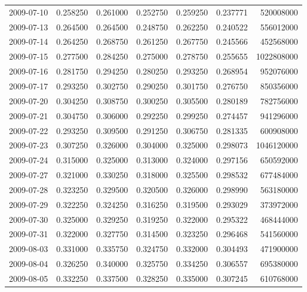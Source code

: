 \begin{tabular}{lrrrrrr}
2009-07-10 &    0.258250 &    0.261000 &    0.252750 &    0.259250 &    0.237771 &   520008000 \\
2009-07-13 &    0.264500 &    0.264500 &    0.248750 &    0.262250 &    0.240522 &   556012000 \\
2009-07-14 &    0.264250 &    0.268750 &    0.261250 &    0.267750 &    0.245566 &   452568000 \\
2009-07-15 &    0.277500 &    0.284250 &    0.275000 &    0.278750 &    0.255655 &  1022808000 \\
2009-07-16 &    0.281750 &    0.294250 &    0.280250 &    0.293250 &    0.268954 &   952076000 \\
2009-07-17 &    0.293250 &    0.302750 &    0.290250 &    0.301750 &    0.276750 &   850356000 \\
2009-07-20 &    0.304250 &    0.308750 &    0.300250 &    0.305500 &    0.280189 &   782756000 \\
2009-07-21 &    0.304750 &    0.306000 &    0.292250 &    0.299250 &    0.274457 &   941296000 \\
2009-07-22 &    0.293250 &    0.309500 &    0.291250 &    0.306750 &    0.281335 &   600908000 \\
2009-07-23 &    0.307250 &    0.326000 &    0.304000 &    0.325000 &    0.298073 &  1046120000 \\
2009-07-24 &    0.315000 &    0.325000 &    0.313000 &    0.324000 &    0.297156 &   650592000 \\
2009-07-27 &    0.321000 &    0.330250 &    0.318000 &    0.325500 &    0.298532 &   677484000 \\
2009-07-28 &    0.323250 &    0.329500 &    0.320500 &    0.326000 &    0.298990 &   563180000 \\
2009-07-29 &    0.322250 &    0.324250 &    0.316250 &    0.319500 &    0.293029 &   373972000 \\
2009-07-30 &    0.325000 &    0.329250 &    0.319250 &    0.322000 &    0.295322 &   468444000 \\
2009-07-31 &    0.322000 &    0.327750 &    0.314500 &    0.323250 &    0.296468 &   541560000 \\
2009-08-03 &    0.331000 &    0.335750 &    0.324750 &    0.332000 &    0.304493 &   471900000 \\
2009-08-04 &    0.326250 &    0.340000 &    0.325750 &    0.334250 &    0.306557 &   695380000 \\
2009-08-05 &    0.332250 &    0.337500 &    0.328250 &    0.335000 &    0.307245 &   610768000 \\

\end{tabular}
